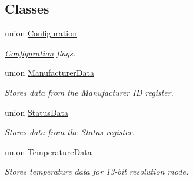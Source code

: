 \subsection*{Classes}
\begin{DoxyCompactItemize}
\item 
union \hyperlink{unioncubesat_1_1ADT7311_1_1Configuration}{Configuration}
\begin{DoxyCompactList}\small\item\em \hyperlink{unioncubesat_1_1ADT7311_1_1Configuration}{Configuration} flags. \end{DoxyCompactList}\item 
union \hyperlink{unioncubesat_1_1ADT7311_1_1ManufacturerData}{Manufacturer\+Data}
\begin{DoxyCompactList}\small\item\em Stores data from the Manufacturer ID register. \end{DoxyCompactList}\item 
union \hyperlink{unioncubesat_1_1ADT7311_1_1StatusData}{Status\+Data}
\begin{DoxyCompactList}\small\item\em Stores data from the Status register. \end{DoxyCompactList}\item 
union \hyperlink{unioncubesat_1_1ADT7311_1_1TemperatureData}{Temperature\+Data}
\begin{DoxyCompactList}\small\item\em Stores temperature data for 13-\/bit resolution mode. \end{DoxyCompactList}\end{DoxyCompactItemize}
